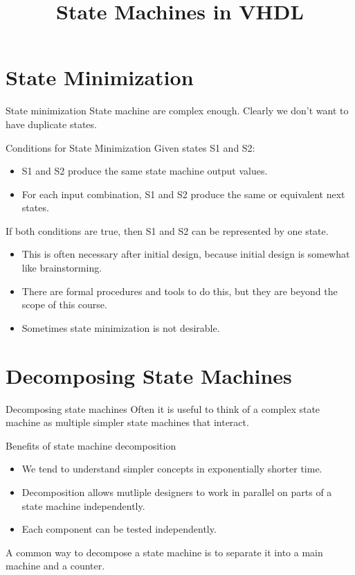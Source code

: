 \title{State Machines in VHDL}

\section{State Minimization}

\begin{frame}{State minimization}
  State machine are complex enough.  Clearly we don't want to have duplicate states.
  \begin{block}{Conditions for State Minimization}
    Given states S1 and S2:
    \begin{itemize}
      \item S1 and S2 produce the same state machine output values.
      \item For each input combination, S1 and S2 produce the same or equivalent next states.
    \end{itemize}
  \end{block}
  If both conditions are true, then S1 and S2 can be represented by one state.
\end{frame}

\begin{itemize}
  \item This is often necessary after initial design, because initial design is somewhat like brainstorming.
  \item There are formal procedures and tools to do this, but they are beyond the scope of this course.
  \item Sometimes state minimization is not desirable.
\end{itemize}

\section{Decomposing State Machines}

\begin{frame}{Decomposing state machines}
  Often it is useful to think of a complex state machine as multiple simpler state machines that interact.
  \begin{block}{Benefits of state machine decomposition}
    \begin{itemize}
      \item We tend to understand simpler concepts in exponentially shorter time.
      \item Decomposition allows mutliple designers to work in parallel on parts of a state machine independently.
      \item Each component can be tested independently.
    \end{itemize}
  \end{block}
  A common way to decompose a state machine is to separate it into a main machine and a counter.
\end{frame}

